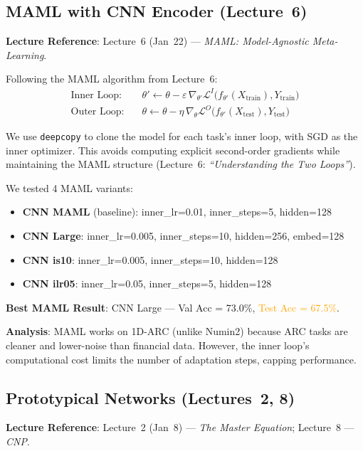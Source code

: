 \documentclass[11pt,a4paper]{article}
\begin{document}
\subsection{MAML with CNN Encoder \textnormal{(Lecture~6)}}

\textbf{Lecture Reference}: Lecture~6 (Jan~22) --- \emph{MAML: Model-Agnostic Meta-Learning}.

Following the MAML algorithm from Lecture~6:
\begin{align}
    \text{Inner Loop:} \quad &\theta' \leftarrow \theta - \varepsilon \, \nabla_{\theta'} \mathcal{L}^I\bigl(f_{\theta'}(X_{\text{train}}), Y_{\text{train}}\bigr) \\
    \text{Outer Loop:} \quad &\theta \leftarrow \theta - \eta \, \nabla_\theta \mathcal{L}^O\bigl(f_{\theta'}(X_{\text{test}}), Y_{\text{test}}\bigr)
\end{align}

We use \texttt{deepcopy} to clone the model for each task's inner loop, with SGD as the inner optimizer. This avoids computing explicit second-order gradients while maintaining the MAML structure (Lecture~6: \emph{``Understanding the Two Loops''}).

We tested 4 MAML variants:
\begin{itemize}[nosep]
    \item \textbf{CNN MAML} (baseline): inner\_lr=0.01, inner\_steps=5, hidden=128
    \item \textbf{CNN Large}: inner\_lr=0.005, inner\_steps=10, hidden=256, embed=128
    \item \textbf{CNN is10}: inner\_lr=0.005, inner\_steps=10, hidden=128
    \item \textbf{CNN ilr05}: inner\_lr=0.05, inner\_steps=5, hidden=128
\end{itemize}

\textbf{Best MAML Result}: CNN Large --- Val Acc = 73.0\%, \textcolor{orange}{Test Acc = 67.5\%}.

\textbf{Analysis}: MAML works on 1D-ARC (unlike Numin2) because ARC tasks are cleaner and lower-noise than financial data. However, the inner loop's computational cost limits the number of adaptation steps, capping performance.

\subsection{Prototypical Networks \textnormal{(Lectures~2, 8)}}

\textbf{Lecture Reference}: Lecture~2 (Jan~8) --- \emph{The Master Equation}; Lecture~8 --- \emph{CNP}.
\end{document}
